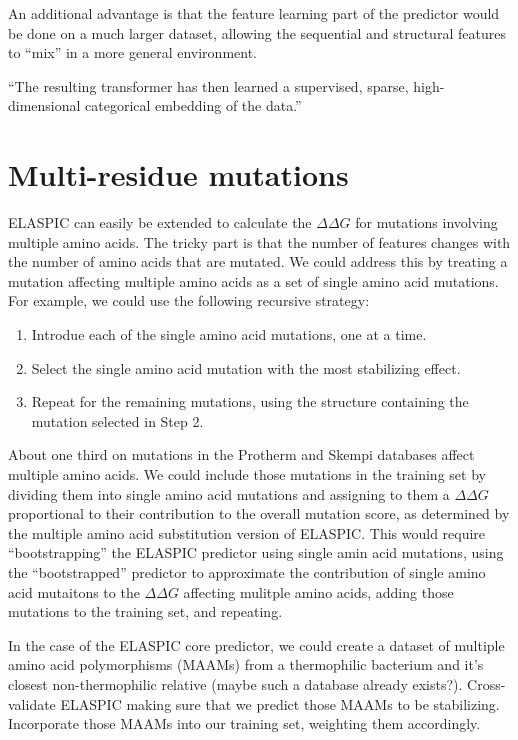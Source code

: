 An additional advantage is that the feature learning part of the predictor would be done on a much larger dataset, allowing the sequential and structural features to ``mix'' in a more general environment.

``The resulting transformer has then learned a supervised, sparse, high-dimensional categorical embedding of the data.''




\section{Multi-residue mutations}

ELASPIC can easily be extended to calculate the $\Delta \Delta G$ for mutations involving multiple amino acids. The tricky part is that the number of features changes with the number of amino acids that are mutated. We could address this by treating a mutation affecting multiple amino acids as a set of single amino acid mutations. For example, we could use the following recursive strategy:

\begin{enumerate}
    \item Introdue each of the single amino acid mutations, one at a time.
    \item Select the single amino acid mutation with the most stabilizing effect.
    \item Repeat for the remaining mutations, using the structure containing the mutation selected in Step 2.
\end{enumerate}

About one third on mutations in the Protherm and Skempi databases affect multiple amino acids. We could include those mutations in the training set by dividing them into single amino acid mutations and assigning to them a $\Delta \Delta G$ proportional to their contribution to the overall mutation score, as determined by the multiple amino acid substitution version of ELASPIC. This would require ``bootstrapping'' the ELASPIC predictor using single amin acid mutations, using the ``bootstrapped'' predictor to approximate the contribution of single amino acid mutaitons to the $\Delta \Delta G$ affecting mulitple amino acids, adding those mutations to the training set, and repeating.

In the case of the ELASPIC core predictor, we could create a dataset of multiple amino acid polymorphisms (MAAMs) from a thermophilic bacterium and it's closest non-thermophilic relative (maybe such a database already exists?). Cross-validate ELASPIC making sure that we predict those MAAMs to be stabilizing. Incorporate those MAAMs into our training set, weighting them accordingly.

